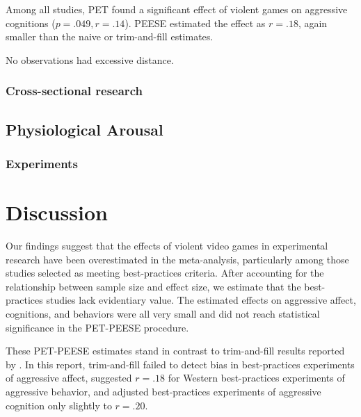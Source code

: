 \documentclass[man]{apa6}
\begin{document}
Among all studies, PET found a significant effect of violent games on aggressive cognitions ($p = .049, r = .14$). PEESE estimated the effect as $r = .18$, again smaller than the naive or trim-and-fill estimates. 

No observations had excessive distance. 

\subsubsection{Cross-sectional research}


\subsection{Physiological Arousal}
\subsubsection{Experiments}

\section{Discussion}
Our findings suggest that the effects of violent video games in experimental research have been overestimated in the \citet{Anderson:etal:2010} meta-analysis, particularly among those studies selected as meeting best-practices criteria. After accounting for the relationship between sample size and effect size, we estimate that the best-practices studies lack evidentiary value. The estimated effects on aggressive affect, cognitions, and behaviors were all very small and did not reach statistical significance in the PET-PEESE procedure. 



These PET-PEESE estimates stand in contrast to trim-and-fill results reported by \citet{Anderson:etal:2010}. In this report, trim-and-fill failed to detect bias in best-practices experiments of aggressive affect, suggested $r = .18$ for Western best-practices experiments of aggressive behavior, and adjusted best-practices experiments of aggressive cognition only slightly to $r = .20$.
\end{document}
